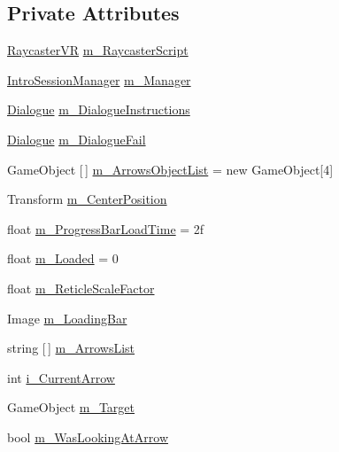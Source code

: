 \subsection*{Private Attributes}
\begin{DoxyCompactItemize}
\item 
\mbox{\hyperlink{class_v_r_standard_assets_1_1_utils_1_1_raycaster_v_r}{Raycaster\+VR}} \mbox{\hyperlink{class_stage1_a8df5a3c960c460aed5d994cc74598294}{m\+\_\+\+Raycaster\+Script}}
\item 
\mbox{\hyperlink{class_intro_session_manager}{Intro\+Session\+Manager}} \mbox{\hyperlink{class_stage1_aa75e5070f730ce1c8a22374540b5a165}{m\+\_\+\+Manager}}
\item 
\mbox{\hyperlink{class_dialogue}{Dialogue}} \mbox{\hyperlink{class_stage1_a5e0b22e242f1dc57f25116368047a74a}{m\+\_\+\+Dialogue\+Instructions}}
\item 
\mbox{\hyperlink{class_dialogue}{Dialogue}} \mbox{\hyperlink{class_stage1_a053a8aac4bdbe9827e07d00b10c89ddb}{m\+\_\+\+Dialogue\+Fail}}
\item 
Game\+Object \mbox{[}$\,$\mbox{]} \mbox{\hyperlink{class_stage1_a61cc42d02ddfdb4c9e2deb58783a2106}{m\+\_\+\+Arrows\+Object\+List}} = new Game\+Object\mbox{[}4\mbox{]}
\item 
Transform \mbox{\hyperlink{class_stage1_a3833d350fc50f9ad32af955e6f2cdd7a}{m\+\_\+\+Center\+Position}}
\item 
float \mbox{\hyperlink{class_stage1_a717cdee3689d0e77cefec54c8f0c6ca4}{m\+\_\+\+Progress\+Bar\+Load\+Time}} = 2f
\item 
float \mbox{\hyperlink{class_stage1_a25cdcb8d515ce432b7656735e6920559}{m\+\_\+\+Loaded}} = 0
\item 
float \mbox{\hyperlink{class_stage1_a6d69553223e46e861ace3e060792508f}{m\+\_\+\+Reticle\+Scale\+Factor}}
\item 
Image \mbox{\hyperlink{class_stage1_a3bf55a6567f3517d9882c4c5e75b9864}{m\+\_\+\+Loading\+Bar}}
\item 
string \mbox{[}$\,$\mbox{]} \mbox{\hyperlink{class_stage1_a19950f79b749e93f7588fe8f2b4c41f4}{m\+\_\+\+Arrows\+List}}
\item 
int \mbox{\hyperlink{class_stage1_a1c91dd1b16a5f371f684ef8c9f8c28b6}{i\+\_\+\+Current\+Arrow}}
\item 
Game\+Object \mbox{\hyperlink{class_stage1_ab34fda2e3ccabd8793c8749951277a6b}{m\+\_\+\+Target}}
\item 
bool \mbox{\hyperlink{class_stage1_a0388f6c2c86f10d5490731d6ba84be39}{m\+\_\+\+Was\+Looking\+At\+Arrow}}

\end{DoxyCompactItemize}
